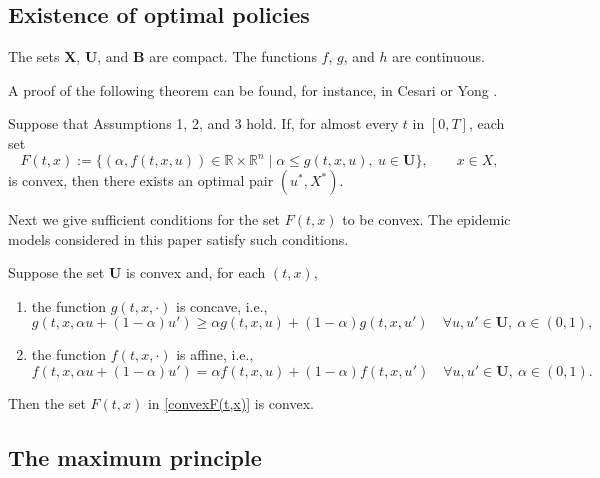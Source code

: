 
\subsection{Existence of optimal policies}

\begin{assumption}\rm The sets $\mathbf{X}$,  $\mathbf{U}$, and $\mathbf{B}$ are compact. The functions $f$, $g$, and $h$ are continuous.
\end{assumption}
A proof of the following theorem can be found, for instance, in Cesari \cite[Sect. 9.3.]{Cesari83} or Yong \cite[Theorem 2.2.1]{Yong2015}. 
\begin{theorem}[Filippov] Suppose that Assumptions 1, 2, and 3 hold. If, for almost every $t$ in $[0,T]$, each set
        \begin{equation}\label{convexF(t,x)}
F(t,x):= \{ (\alpha, f(t,x,u))\in \mathbb{R}\times \mathbb{R}^n\mid  
    \alpha \leq g(t,x,u), \  u\in \mathbf{U}\},\qquad x\in X,
        \end{equation}
is convex, then there exists an optimal pair $(u^\ast,X^\ast)$.
\end{theorem} 
Next we give sufficient conditions for the set $F(t,x)$ to be convex. The epidemic models considered in this paper satisfy such conditions.

\begin{remark}\rm Suppose the set $\mathbf{U}$ is convex and, for each $(t,x)$, 
\begin{enumerate}[\rm (a)]
    \item the function $g(t,x,\cdot)$ is concave, i.e.,
        \[ g(t,x,\alpha u+(1-\alpha)u') \geq \alpha g(t,x,u) +(1-\alpha) g(t,x,u') \quad \forall u,u'\in\mathbf{U},\  \alpha\in (0,1), \]
       
    \item the function $f(t,x,\cdot)$ is affine, i.e., 
      \[ f(t,x,\alpha u+(1-\alpha)u') = \alpha f(t,x,u) +(1-\alpha) f(t,x,u') \quad \forall  u,u'\in\mathbf{U},\   \alpha\in (0,1). \]
\end{enumerate} 
Then the set $F(t,x)$ in \eqref{convexF(t,x)} is convex.
\end{remark}








\subsection{The maximum principle}


